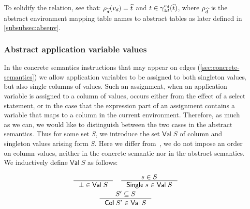 To solidify the relation, see that: $\rho_{\widehat{d}}(v_d) = \widehat{t}$ and $t \in \gamma_{4d}^{v_d}(\widehat{t})$, where $\rho_{\widehat{d}}$ is the abstract environment mapping table names to abstract tables as later defined in \autoref{subsubsec:absenv}.

\subsubsection{Abstract application variable values}
In the concrete semantics instructions that may appear on edges (\ref{sec:concrete-semantics}) we allow application variables to be assigned to both singleton values, but also single columns of values.
Such an assignment, when an application variable is assigned to a column of values, occurs either from the effect of a select statement, or in the case that the expression part of an assignment contains a variable that maps to a column in the current environment.
Therefore, as much as we can, we would like to distinguish between the two cases in the abstract semantics.
Thus for some set $S$, we introduce the set $\mathsf{Val} \; S$ of column and singleton values arising form $S$.
Here we differ from~\cite{halder_abstract_2012}, we do not impose an order on column values, neither in the concrete semantic nor in the abstract semantics.
We inductively define $\mathsf{Val} \; S$ as follows:

\begin{gather*}
    \inference{}{\bot \in \mathsf{Val} \; S} \quad
    \inference{s \in S}{\mathsf{Single} \; s \in \mathsf{Val} \; S}\\
    \inference{S' \subseteq S}{\mathsf{Col} \; S' \in \mathsf{Val} \; S}
\end{gather*}


